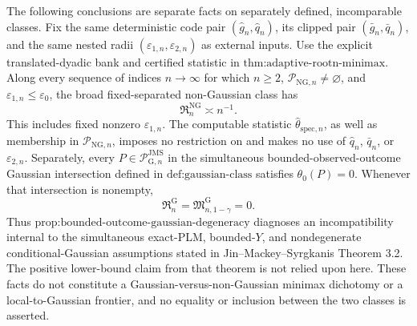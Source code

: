 The following conclusions are separate facts on separately defined, incomparable classes.  Fix the same deterministic code pair \((\widehat g_n,\widehat q_n)\), its clipped pair \((\bar g_n,\bar q_n)\), and the same nested radii \((\varepsilon_{1,n},\varepsilon_{2,n})\) as external inputs.  Use the explicit translated-dyadic bank and certified statistic in \(\text{thm:adaptive-rootn-minimax}\).  Along every sequence of indices \(n\to\infty\) for which \(n\ge2\), \(\mathcal P_{\mathrm{NG},n}\neq\varnothing\), and \(\varepsilon_{1,n}\le\varepsilon_0\), the broad fixed-separated non-Gaussian class has
\[
 \mathfrak R_n^{\mathrm{NG}}\asymp n^{-1}.
\]
This includes fixed nonzero \(\varepsilon_{1,n}\).  The computable statistic \(\widehat\theta_{\mathrm{spec},n}\), as well as membership in \(\mathcal P_{\mathrm{NG},n}\), imposes no restriction on and makes no use of \(\widehat q_n\), \(\bar q_n\), or \(\varepsilon_{2,n}\).  Separately, every \(P\in\mathcal P_{\mathrm G,n}^{\mathrm{JMS}}\) in the simultaneous bounded-observed-outcome Gaussian intersection defined in \(\text{def:gaussian-class}\) satisfies \(\theta_0(P)=0\).  Whenever that intersection is nonempty,
\[
 \mathfrak R_n^{\mathrm G}=\mathfrak M_{n,1-\gamma}^{\mathrm G}=0.
\]
Thus \(\text{prop:bounded-outcome-gaussian-degeneracy}\) diagnoses an incompatibility internal to the simultaneous exact-PLM, bounded-\(Y\), and nondegenerate conditional-Gaussian assumptions stated in Jin--Mackey--Syrgkanis Theorem 3.2.  The positive lower-bound claim from that theorem is not relied upon here.  These facts do not constitute a Gaussian-versus-non-Gaussian minimax dichotomy or a local-to-Gaussian frontier, and no equality or inclusion between the two classes is asserted.